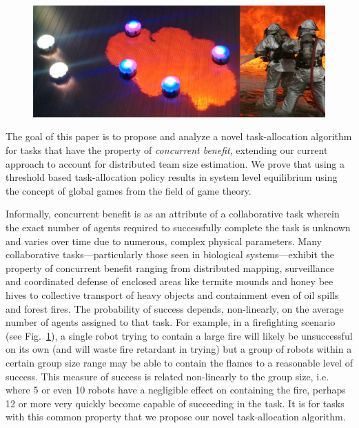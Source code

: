 \documentclass[conference]{ieeeconf}
\begin{document}
\begin{figure}[!ht]
\centering\includegraphics[width=\textwidth]{../figures/dropletfire.png}
\centering\caption{}\label{fig:dropletfire}
\end{figure}

The goal of this paper is to propose and analyze a novel task-allocation algorithm for tasks that have the property of \emph{concurrent benefit}, extending our current approach to account for distributed team size estimation. We prove that using a threshold based task-allocation policy results in system level equilibrium using the concept of global games from the field of game theory. 

Informally, concurrent benefit is as an attribute of a collaborative task wherein the exact number of agents required to successfully complete the task is unknown and varies over time due to numerous, complex physical parameters. Many collaborative tasks---particularly those seen in biological systems---exhibit the property of concurrent benefit ranging from distributed mapping, surveillance and coordinated defense of enclosed areas like termite mounds and honey bee hives to collective transport of heavy objects and containment even of oil spills and forest fires. The probability of success depends, non-linearly, on the average number of agents assigned to that task. For example, in a firefighting scenario (see Fig.~\ref{fig:dropletfire}), a single robot trying to contain a large fire will likely be unsuccessful on its own (and will waste fire retardant in trying) but a group of robots within a certain group size range may be able to contain the flames to a reasonable level of success. This measure of success is related non-linearly to the group size, i.e. where 5 or even 10 robots have a negligible effect on containing the fire, perhaps 12 or more very quickly become capable of succeeding in the task. It is for tasks with this common property that we propose our novel task-allocation algorithm.
\end{document}

